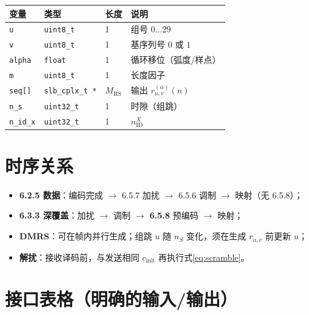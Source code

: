 \documentclass[11pt,a4paper]{ctexart}
\begin{document}
\begin{table}[h]
\centering
\small
\begin{tabular}{llll}
\toprule
\textbf{变量} & \textbf{类型} & \textbf{长度} & \textbf{说明} \\
\midrule
\texttt{u} & \texttt{uint8\_t} & 1 & 组号 $0\ldots 29$ \\
\texttt{v} & \texttt{uint8\_t} & 1 & 基序列号 $0$ 或 $1$ \\
\texttt{alpha} & \texttt{float} & 1 & 循环移位（弧度/样点） \\
\texttt{m} & \texttt{uint8\_t} & 1 & 长度因子 \\
\texttt{seq[]} & \texttt{slb\_cplx\_t *} & $M_{\mathrm{RS}}$ & 输出 $r_{u,v}^{(\alpha)}(n)$ \\
\texttt{n\_s} & \texttt{uint32\_t} & 1 & 时隙（组跳） \\
\texttt{n\_id\_x} & \texttt{uint32\_t} & 1 & $n_{\mathrm{ID}}^{X}$ \\
\bottomrule
\end{tabular}
\end{table}

\section{时序关系}

\begin{itemize}[nosep]
  \item \textbf{6.2.5 数据}：编码完成 $\rightarrow$ 6.5.7 加扰 $\rightarrow$ 6.5.6 调制 $\rightarrow$ 映射（无 6.5.8）；
  \item \textbf{6.3.3 深覆盖}：加扰 $\rightarrow$ 调制 $\rightarrow$ \textbf{6.5.8} 预编码 $\rightarrow$ 映射；
  \item \textbf{DMRS}：可在帧内并行生成；组跳 $u$ 随 $n_S$ 变化，须在生成 $r_{u,v}$ 前更新 $u$；
  \item \textbf{解扰}：接收译码前，与发送相同 $c_{\mathrm{init}}$ 再执行式\eqref{eq:scramble}。
\end{itemize}

\section{接口表格（明确的输入/输出）}
\end{document}
